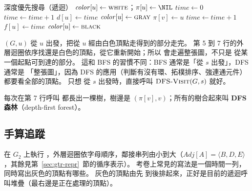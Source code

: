 \begin{pseudo}[label=alg:gtr-dfs]{深度優先搜尋（遞迴）}
        \State $\mathit{color}[u] \gets \textsc{white}$；$\pi[u] \gets \NIL$
    \EndFor
    \State $\mathit{time} \gets 0$
     
            \State {}
        \EndIf
    \EndFor
\EndProcedure
{}
    \State $\mathit{time} \gets \mathit{time} + 1$
    \State $d[u] \gets \mathit{time}$
    \State $\mathit{color}[u] \gets \textsc{gray}$
     
            \State $\pi[v] \gets u$
            \State {}
        \EndIf
    \EndFor
    \State $\mathit{time} \gets \mathit{time} + 1$
    \State $f[u] \gets \mathit{time}$
    \State $\mathit{color}[u] \gets \textsc{black}$
\EndProcedure
\end{pseudo}

$(G, u)$ 從 $u$ 出發，把從 $u$ 經由白色頂點走得到的部分走完。 第 5 到
7 行的外層迴圈依序找還是白色的頂點，從它重新開始；所以  會走遍整張圖，不只是
從某一個起點可到達的部分。 這和 BFS 的習慣不同：BFS 通常是「從 $s$ 出發」，DFS 通常是
「整張圖」，因為 DFS 的應用（判斷有沒有環、拓樸排序、強連通元件）都要看全部的頂點。 只想
從 $s$ 出發時，直接呼叫 $\proc{DFS-Visit}(G, s)$ 就好。

每次在第 7 行呼叫  都長出一棵樹，樹邊是 $(\pi[v], v)$；所有的樹合起來叫
\textbf{DFS 森林}（depth-first forest）。

\subsection{手算追蹤}
\label{sec:gtr-dfs-trace}

在 $G_2$ 上執行 ，外層迴圈依字母順序，鄰接串列由小到大（$\mathit{Adj}[A] = \langle B, D, E
\rangle$，其餘見第~\ref{sec:gtr-repr}~節的循序表示）。 考卷上常見的寫法是一個時間一列，同時寫出灰色的頂點有哪些。 灰色的頂點由先
到後排起來，正好是目前的遞迴呼叫堆疊（最右邊是正在處理的頂點）。

